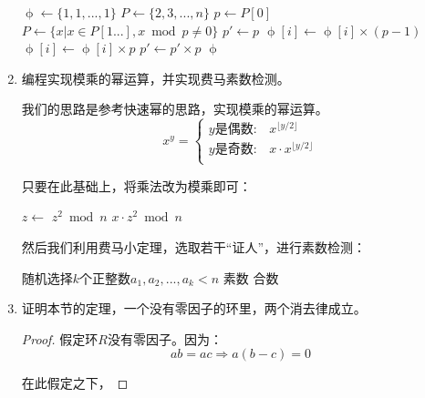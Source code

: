 \documentclass[UTF8]{article}
\begin{document}
\begin{enumerate}
\begin{algorithmic}
  \State $\upphi \gets \{1, 1, ..., 1\}$ 
  \State $P \gets \{2, 3, ..., n\}$ 
    \State $p \gets P[0]$
    \State $P \gets \{x | x \in P[1...], x \bmod p \neq 0\}$
    \State $p' \gets p$
    \Repeat
          \State $\upphi[i] \gets \upphi[i] \times (p - 1)$
        \Else
          \State $\upphi[i] \gets \upphi[i] \times p$
        \EndIf
      \EndFor
      \State $p' \gets p' \times p$
  \EndWhile
  \State \Return $\upphi$
\EndFunction
\end{algorithmic}

\item 编程实现模乘的幂运算，并实现费马素数检测。

我们的思路是参考快速幂的思路，实现模乘的幂运算。
\[
x^y =
\begin{cases}
y \text{是偶数}: & x^{\lfloor y / 2 \rfloor} \\
y \text{是奇数}: & x \cdot x^{\lfloor y / 2 \rfloor} \\
\end{cases}
\]

只要在此基础上，将乘法改为模乘即可：

\begin{algorithmic}
    \State {}
  \EndIf
  \State $z \gets$ 
    \State \Return $z^2 \bmod n$
  \Else
    \State \Return $x \cdot z^2 \bmod n$
  \EndIf
\EndFunction
\end{algorithmic}

然后我们利用费马小定理，选取若干“证人”，进行素数检测：

\begin{algorithmic}
  \State 随机选择$k$个正整数$a_1, a_2, ..., a_k < n$
    \State \Return 素数
  \Else
    \State \Return 合数
  \EndIf
\EndFunction
\end{algorithmic}

\item {证明本节的定理，一个没有零因子的环里，两个消去律成立。}

\begin{proof}
假定环$R$没有零因子。因为：
\[
  ab = ac \Rightarrow a(b - c) = 0
\]

在此假定之下，


\end{proof}
\end{enumerate}
\end{document}
